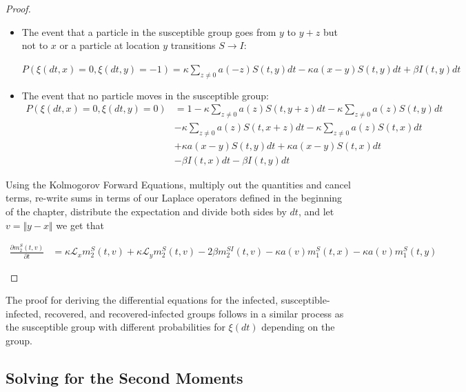 \documentclass[sn-basic]{sn-jnl}%
\theoremstyle{thmstyleone}%
\theoremstyle{thmstyletwo}%
\theoremstyle{thmstylethree}%
\numberwithin{equation}{theorem}
\begin{document}
\begin{proof}
\begin{itemize}
\begin{center}
$P(\xi(dt,x)= 0, \xi(dt,y)= 1)= \kappa \sum\limits_{z \neq 0} a(z) S(t,y+z)dt - \kappa a(x-y) S(t,x)dt$
\end{center}
\item The event that a particle in the susceptible group goes from $y$ to $y+z$ but not to $x$ or a particle at location $y$ transitions $S \rightarrow I$:
\begin{center}
$P(\xi(dt,x)= 0, \xi(dt,y)= -1)= \kappa \sum\limits_{z \neq 0} a(-z) S(t,y)dt - \kappa a(x-y) S(t,y)dt + \beta I(t,y)dt$ 
\end{center}
\item The event that no particle moves in the susceptible group:
\begin{align*}
P(\xi(dt,x)= 0, \xi(dt,y)= 0) &= 1 - \kappa \sum\limits_{z \neq 0} a(z)S(t,y+z)dt - \kappa \sum\limits_{z \neq 0} a(z)S(t,y)dt\\
&- \kappa \sum\limits_{z \neq 0} a(z)S(t,x+z)dt- \kappa \sum\limits_{z \neq 0} a(z)S(t,x)dt\\
&+ \kappa a(x-y) S(t,y)dt + \kappa a(x-y) S(t,x)dt\\
&- \beta I(t,x)dt - \beta I(t,y)dt
\end{align*}
\end{itemize}

Using the Kolmogorov Forward Equations, multiply out the quantities and cancel terms, re-write sums in terms of our Laplace operators defined in the beginning of the chapter, distribute the expectation and divide both sides by $dt$, and let $v = \Vert y-x \Vert$ we get that
\begin{small}
\begin{align*}
\displaystyle \frac{\partial m_{2}^{S}(t,v)}{\partial t} &= \kappa \mathcal{L}_{x} m_{2}^{S}(t,v) + \kappa \mathcal{L}_{y} m_{2}^{S}(t,v) - 2 \beta m_{2}^{SI}(t,v)- \kappa a(v) m_{1}^{S}(t,x) -\kappa a(v) m_{1}^{S}(t,y)
\end{align*}
\end{small}
\end{proof}

The proof for deriving the differential equations for the infected, susceptible-infected, recovered, and recovered-infected groups follows in a similar process as the susceptible group with different probabilities for $\xi(dt)$ depending on the group. 

\subsection{Solving for the Second Moments}
\end{document}

